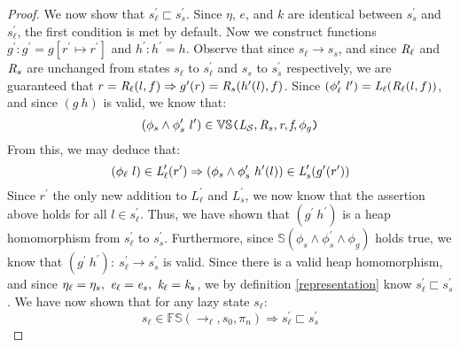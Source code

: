 \begin{proof}
We now show that $s_\ell^\prime \sqsubset s_s^\prime$. Since $\eta$, $e$, and $k$ are identical between $s_s^\prime$ and $s_\ell^\prime $, the first condition is met by default. Now we construct functions $g^\prime : g^\prime = g[ r^\prime \mapsto r^\prime]$ and $h^\prime : h^\prime = h$. Observe that since $s_\ell \rightarrow s_s$, and since $\emph{R}_\ell$ and $\emph{R}_s$ are unchanged from states $s_\ell$ to $s_\ell^\prime$ and $s_s$ to $s_s^\prime$ respectively, we are guaranteed that $ r = \emph{R}_\ell(l,f) \Rightarrow g^\prime(r) = \emph{R}_s(h^\prime(l),f)$. Since $(\phi_\ell^\prime\ l^\prime) =  \emph{L}_\ell(\emph{R}_\ell(l,f))$, and since $(g\ h)$ is valid, we know that:
 $$(\phi_s \wedge \phi_s^\prime\ l^\prime) \in \mathbb{VS}\texttt{(} \emph{L}_{\mathcal{S}},\emph{R}_{s},\emph{r},\emph{f},\phi_g\texttt{)}$$ 
From this, we may deduce that:
$$ (\phi_\ell\ l) \in \cfgnt{L}_\ell^\prime(r^\prime) \Rightarrow (\phi_s \wedge \phi_s^\prime\ h^\prime(l))\in \cfgnt{L}_s^\prime(g^\prime(r^\prime))$$
Since $r^\prime$ the only new addition to $L_\ell^\prime$ and $L_s^\prime$, we now know that the assertion above holds for all $l \in s_\ell^\prime$. Thus, we have shown that $(g^\prime\ h^\prime)$ is a heap homomorphism from $s_\ell^\prime$ to $s_s^\prime$. Furthermore, since $\mathbb{S}(\phi_s\wedge\phi_s^\prime\wedge \phi_g)$ holds true, we know that $(g^\prime\ h^\prime):\ s_\ell^\prime \rightarrow s_s^\prime$ is valid. Since there is a valid heap homomorphism, and since $\eta_{\ell} = \eta_{s} ,\ \emph{e}_{\ell} = \emph{e}_{s} ,\ \emph{k}_{\ell} = \emph{k}_{s}$, we  by definition \ref{representation} know $s_\ell^\prime \sqsubset s_s^\prime$. We have now shown that for any lazy state $s_\ell$: 
$$s_\ell \in \mathbb{FS}(\rightarrow_{\ell},s_0,\pi_n) \Rightarrow s_\ell^\prime \sqsubset s_s^\prime$$



\end{proof}
